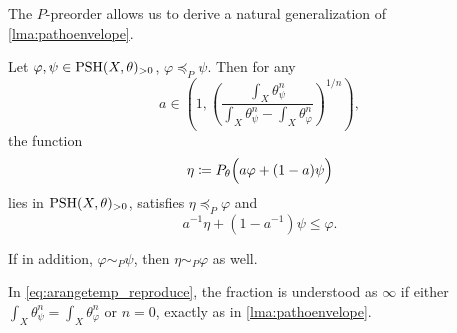 The $P$-preorder allows us to derive a natural generalization of \cref{lma:pathoenvelope}.
\begin{theorem}\label{thm:pathoenvelope}
    Let $\varphi,\psi\in \mathrm{PSH}(X,\theta)_{>0}$, $\varphi\preceq_P \psi$. Then for any
    \begin{equation}\label{eq:arangetemp_reproduce}
        a\in \left( 1, \left(\frac{\int_X \theta_{\psi}^n}{\int_X \theta_{\psi}^n-\int_X \theta_{\varphi}^n}\right)^{1/n} \right),
    \end{equation}
    the function
    \[
        \eta\coloneqq P_{\theta}\Bigl(a\varphi+(1-a)\psi\Bigr)
    \]
    lies in $\mathrm{PSH}(X,\theta)_{>0}$, satisfies $\eta\preceq_P \varphi$ and
    \begin{equation}\label{eq:path_env_reproduce}
        a^{-1}\eta+\left(1-a^{-1}\right)\psi\leq \varphi.
    \end{equation}

    If in addition, $\varphi\sim_P \psi$, then $\eta\sim_P \varphi$ as well.
\end{theorem}
In \eqref{eq:arangetemp_reproduce}, the fraction is understood as $\infty$ if either $\int_X \theta_{\psi}^n=\int_X \theta_{\varphi}^n$ or $n=0$, exactly as in \cref{lma:pathoenvelope}.
